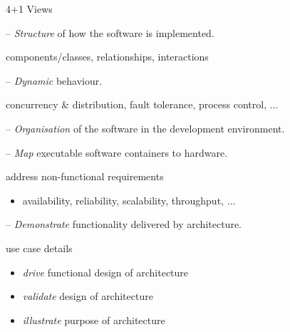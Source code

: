 \documentclass{slide}
\begin{document}
\begin{frame}{4+1 Views}

\Large{
\begin{description}
    \item<1->[Logical] -- \textit{Structure} of how the software is implemented.
    \begin{itemize}
        \large{\item[$\bullet$] components/classes, relationships, interactions}
    \end{itemize}
    \item<2->[Process] -- \textit{Dynamic} behaviour.
    \begin{itemize}
        \large{\item[$\bullet$] concurrency \& distribution, fault tolerance, process control, ...}
    \end{itemize}
    \item<3->[Development] -- \textit{Organisation} of the software in the development environment.
    \item<4->[Physical] -- \textit{Map} executable software containers to hardware.
    \begin{itemize}
        \large{\item[$\bullet$] address non-functional requirements}
        \begin{itemize}
            \item[$\bullet$] availability, reliability, scalability, throughput, ...
        \end{itemize}
    \end{itemize}
    \item<5->[Scenario] -- \textit{Demonstrate} functionality delivered by architecture.
    \begin{itemize}
        \large{\item[$\bullet$] use case details}
        \begin{itemize}
            \item[$\bullet$] \textit{drive} functional design of architecture
            \item[$\bullet$] \textit{validate} design of architecture
            \item[$\bullet$] \textit{illustrate} purpose of architecture
        \end{itemize}
    \end{itemize}
\end{description}
}

\end{frame}
\end{document}
